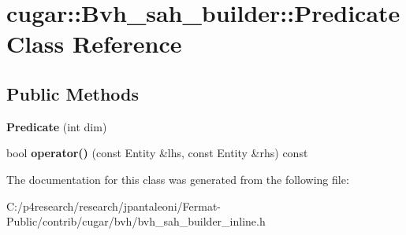 \hypertarget{classcugar_1_1_bvh__sah__builder_1_1_predicate}{}\section{cugar\+:\+:Bvh\+\_\+sah\+\_\+builder\+:\+:Predicate Class Reference}
\label{classcugar_1_1_bvh__sah__builder_1_1_predicate}
\subsection*{Public Methods}
\begin{DoxyCompactItemize}
\item 
\mbox{\label{classcugar_1_1_bvh__sah__builder_1_1_predicate_abfb141ab70605a70d55932560f9d104a}} 
{\bfseries Predicate} (int dim)
\item 
\mbox{\label{classcugar_1_1_bvh__sah__builder_1_1_predicate_acef0e250cb7eda3bf2ea5d70fb065898}} 
bool {\bfseries operator()} (const Entity \&lhs, const Entity \&rhs) const
\end{DoxyCompactItemize}


The documentation for this class was generated from the following file\+:\begin{DoxyCompactItemize}
\item 
C\+:/p4research/research/jpantaleoni/\+Fermat-\/\+Public/contrib/cugar/bvh/bvh\+\_\+sah\+\_\+builder\+\_\+inline.\+h\end{DoxyCompactItemize}
